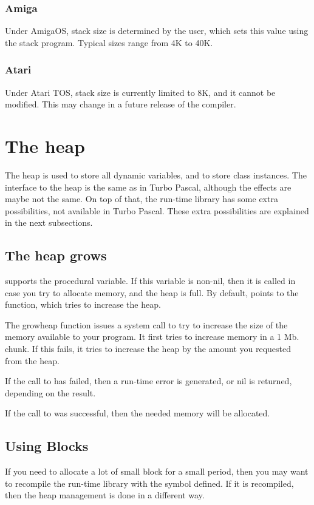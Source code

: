 \documentclass{report}
\begin{document}
\subsubsection{ Amiga }

Under AmigaOS, stack size is determined by the user, which sets this
value using the stack program. Typical sizes range from 4K to 40K.

\subsubsection{ Atari }

Under Atari TOS, stack size is currently limited to 8K, and it cannot
be modified. This may change in a future release of the compiler.

\section{The heap}
\label{se:Heap}
The heap is used to store all dynamic variables, and to store class
instances. The interface to the heap is the same as in Turbo Pascal,
although the effects are maybe not the same. On top of that, the \fpc
run-time library has some extra possibilities, not available in Turbo
Pascal. These extra possibilities are explained in the next subsections.


\subsection{The heap grows}
\fpc supports the  procedural variable. If this variable is
non-nil, then it is called in case you try to allocate memory, and the heap
is full. By default,  points to the  function,
which tries to increase the heap.

The growheap function issues a system call to try to increase the size of the
memory available to your program. It first tries to increase memory in a 1 Mb.
chunk. If this fails, it tries to increase the heap by the amount you
requested from the heap.

If the call to  has failed, then a run-time error is generated,
or nil is returned, depending on the  result.

If the call to  was successful, then the needed memory will be
allocated.

\subsection{Using Blocks}
If you need to allocate a lot of small block for a small period, then you
may want to recompile the run-time library with the  symbol
defined. If it is recompiled, then the heap management is done in a
different way.
\end{document}
